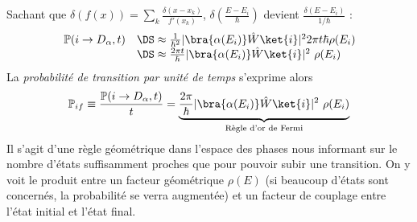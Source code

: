 	Sachant que $\delta(f(x)) = \sum_k \frac{\delta(x-x_k)}{f'(x_k)}$, $\delta\left(\frac{E-E_i}{\hbar}\right)$ 
	devient $\frac{\delta(E-E_i)}{1/\hbar}$ : 
	\begin{equation}
\begin{array}{ll}
	\mathbb{P}(i\rightarrow D_\alpha,t) &\DS\approx \frac{1}{\hbar^2}	|\bra{\alpha(E_i)}\hat{W}\ket{i}|^2 
	2\pi t\hbar\rho(E_i)\\
	&\DS\approx \frac{2\pi t}{\hbar}|\bra{\alpha(E_i)}\hat{W}\ket{i}|^2\ \rho(E_i)
\end{array}
	\end{equation}
	La \textit{probabilité de transition par unité de temps} s'exprime alors 
	\begin{equation}
	\mathbb{P}_{if} \equiv \dfrac{\mathbb{P}(i\rightarrow D_\alpha,t)}{t} = 
	\underbrace{\frac{2\pi}{\hbar}|\bra{\alpha(E_i)}\hat{W}\ket{i}|^2\ \rho(E_i)}_{\text{Règle d'or de Fermi}}
	\end{equation}
	Il s'agit d'une règle géométrique dans l'espace des phases nous informant sur le nombre d'états 
	suffisamment proches que pour pouvoir subir une transition. On y voit le produit entre un 
	facteur géométrique $\rho(E)$ (si beaucoup d'états sont concernés, la probabilité se verra augmentée) 
	et un facteur de couplage entre l'état initial et l'état final.\\
	
	
	
	
\newpage	
	
	
